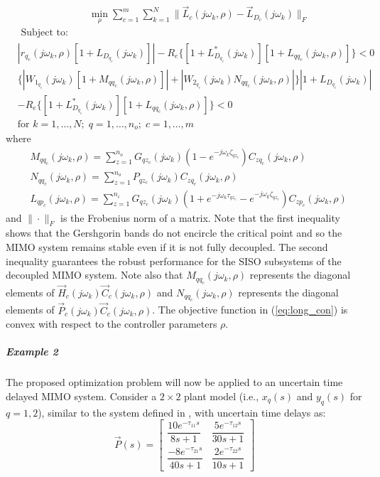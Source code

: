 \documentclass[default]{svmult}
\begin{document}
\begin{align}\label{eq:long_con}
&\hspace{3cm} \min_\rho \sum_{c=1}^{m} \sum_{k=1}^N \|\vec{L}_c(j\omega_k,\rho)-\vec{L}_{D_{c}}(j\omega_k)\|_F \nonumber\\
&\mbox{ Subject to: } \nonumber\\
&|r_{q_{c}}(j\omega_k,\rho)[1+L_{D_{q_{c}}}(j\omega_k)]|-R_e\{[1+L^*_{D_{q_{c}}}(j\omega_k)][1+L_{qq_{c}}(j\omega_k,\rho)]\}<0 \nonumber\\
&\{|W_{1_{q_{c}}}(j\omega_k)[1+M_{qq_{c}}(j\omega_k,\rho)]|+|W_{2_{q_{c}}}(j\omega_k)N_{qq_{c}}(j\omega_k,\rho)|\}|1+L_{D_{q_{c}}}(j\omega_k)| \nonumber\\
&-R_e\{[1+L^*_{D_{q_{c}}}(j\omega_k)][1+L_{qq_{c}}(j\omega_k,\rho)]\}<0 \nonumber\\
&\mbox{for } k=1,\ldots,N;\;  q=1,\ldots,n_o; \; c=1,\ldots,m
\end{align}
where 
\begin{align*}
&M_{qq_{c}}(j\omega_k,\rho)=\sum_{z=1}^{n_o} G_{qz_{c}}(j\omega_k)(1-e^{-j\omega_k \zeta_{qz_{c}}})C_{zq_{c}}(j\omega_k,\rho) \\
&N_{qq_{c}}(j\omega_k,\rho)=\sum_{z=1}^{n_o} P_{qz_{c}}(j\omega_k)C_{zq_{c}}(j\omega_k,\rho)  \\
&L_{qp_{c}}(j\omega_k,\rho)=\sum_{z=1}^{n_i} G_{qz_{c}}(j\omega_k)(1+e^{-j\omega_k \tau_{qz_{c}}}-e^{-j\omega_k \zeta_{qz_{c}}})C_{zp_{c}}(j\omega_k,\rho)
\end{align*}
and $\|\cdot\|_{F}$ is the Frobenius norm of a matrix. 
Note that the first inequality shows that the Gershgorin bands do not encircle the critical point and so the MIMO system remains stable even if it is not fully decoupled. The second inequality guarantees the robust performance for the SISO subsystems of the decoupled MIMO system.  Note also that $M_{qq_{c}}(j\omega_k,\rho)$ represents the diagonal elements of $\vec{H}_c(j\omega_k)\vec{C}_c(j\omega_k,\rho)$ and $N_{qq_{c}}(j\omega_k,\rho)$ represents the diagonal elements of $\vec{P}_c(j\omega_k)\vec{C}_c(j\omega_k,\rho)$. The objective function in (\ref{eq:long_con}) is convex with respect to the controller parameters $\rho$.
\subparagraph{Example 2}
The proposed optimization problem will now be applied to an uncertain time delayed MIMO system. Consider a $2 \times 2$ plant model (i.e., $x_q(s)$ and $y_q(s)$ for $q=1,2$), similar to the system defined in \cite{GKL10b}, with uncertain time delays as:
\begin{equation}
\renewcommand{\arraystretch}{2.2}
\vec{P}(s)=
\begin{bmatrix}
         \dfrac{10e^{-\tau_{11}s}}{8s+1} & \dfrac{5e^{-\tau_{12}s}}{30s+1}\\
         \dfrac{-8e^{-\tau_{21}s}}{40s+1} & \dfrac{2e^{-\tau_{22}s}}{10s+1}
\end{bmatrix}
\end{equation}
\end{document}
